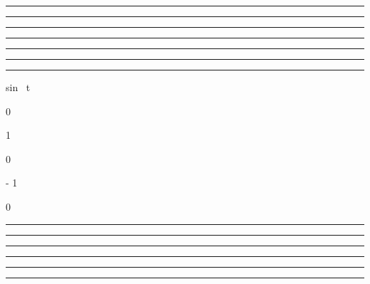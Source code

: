 \documentclass[]{article}
\begin{document}
\begin{center}\rule{3in}{0.4pt}\end{center}

\begin{center}\rule{3in}{0.4pt}\end{center}

\begin{center}\rule{3in}{0.4pt}\end{center}

\begin{center}\rule{3in}{0.4pt}\end{center}

\begin{center}\rule{3in}{0.4pt}\end{center}

\begin{center}\rule{3in}{0.4pt}\end{center}

\begin{center}\rule{3in}{0.4pt}\end{center}

sin~ t

0

\nearrow

1

\searrow

0

\searrow

- 1

\nearrow

0

\begin{center}\rule{3in}{0.4pt}\end{center}

\begin{center}\rule{3in}{0.4pt}\end{center}

\begin{center}\rule{3in}{0.4pt}\end{center}

\begin{center}\rule{3in}{0.4pt}\end{center}

\begin{center}\rule{3in}{0.4pt}\end{center}

\begin{center}\rule{3in}{0.4pt}\end{center}
\end{document}
